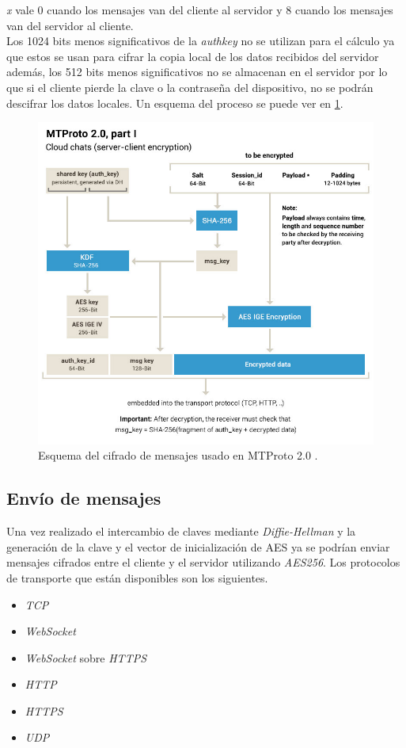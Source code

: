 \emph{x} vale 0 cuando los mensajes van del cliente al servidor y 8 cuando los mensajes van del servidor al cliente.\\
Los 1024 bits menos significativos de la \emph{auth\textunderscore key} no se utilizan para el cálculo ya que estos se usan para cifrar la copia local de los datos recibidos del servidor además, los 512 bits menos significativos no se almacenan en el servidor por lo que si el cliente pierde la clave o la contraseña del dispositivo, no se podrán descifrar los datos locales. Un esquema del proceso se puede ver en \ref{mtproto2}.
\begin{figure}[htb]
	\centering
	\includegraphics[scale=0.4]{imagenes/diagramaMTProto.jpg} 
	\caption{Esquema del cifrado de mensajes usado en MTProto 2.0 \cite{WebProto}.}
	\label{mtproto2}
\end{figure}

\subsection{Envío de mensajes}
Una vez realizado el intercambio de claves mediante \emph{Diffie-Hellman} y la generación de la clave y el vector de inicialización de AES ya se podrían enviar mensajes cifrados entre el cliente y el servidor utilizando \emph{AES256}.
Los protocolos de transporte que están disponibles son los siguientes.
\begin{itemize}
	\item \emph{TCP}
	\item \emph{WebSocket}
	\item \emph{WebSocket} sobre \emph{HTTPS}
	\item \emph{HTTP}
	\item \emph{HTTPS}
	\item \emph{UDP}
\end{itemize}


